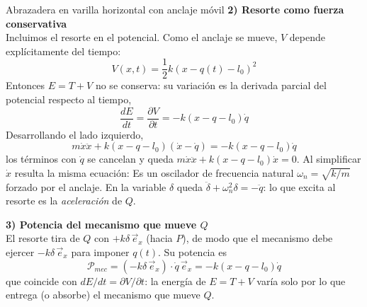 \begin{solucion}{Abrazadera en varilla horizontal con anclaje móvil}
\textbf{2) Resorte como fuerza conservativa}\\
Incluimos el resorte en el potencial. Como el anclaje se mueve, $V$ depende explícitamente del tiempo:
$$V(x,t)=\frac{1}{2}k\left(x-q(t)-l_0\right)^2$$
Entonces $E=T+V$ no se conserva: su variación es la derivada parcial del potencial respecto al tiempo,
$$\frac{dE}{dt}=\frac{\partial V}{\partial t}=-k\left(x-q-l_0\right)\dot{q}$$
Desarrollando el lado izquierdo,
$$m\dot{x}\ddot{x}+k\left(x-q-l_0\right)\left(\dot{x}-\dot{q}\right)=-k\left(x-q-l_0\right)\dot{q}$$
los términos con $\dot{q}$ se cancelan y queda $m\dot{x}\ddot{x}+k\left(x-q-l_0\right)\dot{x}=0$. Al simplificar $\dot{x}$ resulta la misma ecuación:
Es un oscilador de frecuencia natural $\omega_n=\sqrt{k/m}$ forzado por el anclaje. En la variable $\delta$ queda $\ddot\delta+\omega_n^2\delta=-\ddot{q}$: lo que excita al resorte es la \emph{aceleración} de $Q$.

\textbf{3) Potencia del mecanismo que mueve $Q$}\\
El resorte tira de $Q$ con $+k\delta\,\vec{e}_x$ (hacia $P$), de modo que el mecanismo debe ejercer $-k\delta\,\vec{e}_x$ para imponer $q(t)$. Su potencia es
$$\mathcal{P}_{mec}=\left(-k\delta\,\vec{e}_x\right)\cdot\dot{q}\,\vec{e}_x=-k\left(x-q-l_0\right)\dot{q}$$
que coincide con $dE/dt=\partial V/\partial t$: la energía de $E=T+V$ varía solo por lo que entrega (o absorbe) el mecanismo que mueve $Q$.

\end{solucion}
